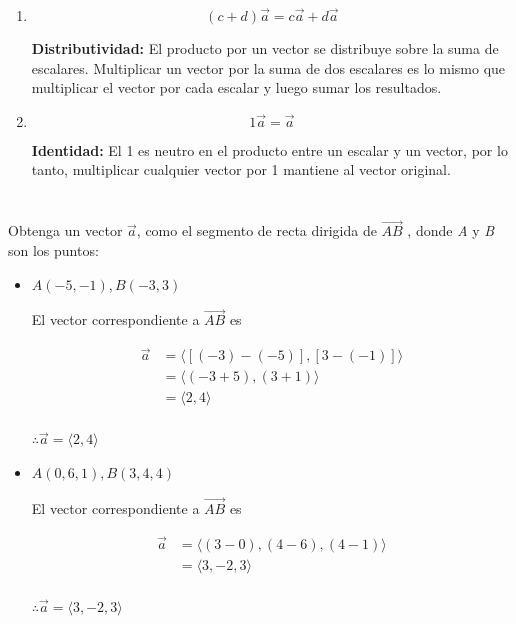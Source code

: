 \documentclass[12pt]{article}
\begin{document}
\begin{enumerate}[format=\textbf]
\item $$(c+d)\vec{a} = c\vec{a}+d\vec{a}$$
  
  \textbf{Distributividad:} El producto por un vector se distribuye sobre la suma de escalares. Multiplicar un vector por la suma de dos escalares es lo mismo que multiplicar el vector por cada escalar y luego sumar los resultados.
  
\item $$1\vec{a} = \vec{a}$$
  
  \textbf{Identidad:} El 1 es neutro en el producto entre un escalar y un vector, por lo tanto, multiplicar cualquier vector por 1 mantiene al vector original.
  
\end{enumerate}

\section{}

Obtenga un vector $\vec{a}$, como el segmento de recta dirigida de $\vec{AB}$ , donde \textit{A} y \textit{B} son los puntos:

\begin{itemize}
  
\item $A(-5,-1) , B(-3,3)$

  El vector correspondiente a $\vec{AB}$ es

  \begin{align*}
    \vec{a}
    &=
    \langle
    [(-3)-(-5)],
    [3-(-1)]
    \rangle \\
    &=
    \langle
    (-3+5),
    (3+1)
    \rangle \\
    &=
    \langle
    2,
    4
    \rangle \\
  \end{align*}

  $\therefore \vec{a} = \langle 2, 4 \rangle$
  
\item $A(0,6,1), B(3,4,4)$

  El vector correspondiente a $\vec{AB}$ es

  \begin{align*}
    \vec{a}
    &=
    \langle
    (3-0),
    (4-6),
    (4-1)
    \rangle \\
    &=
    \langle
    3,
    -2,
    3
    \rangle \\
  \end{align*}

  $\therefore \vec{a} = \langle 3, -2, 3 \rangle$
  
\end{itemize}
\end{document}
